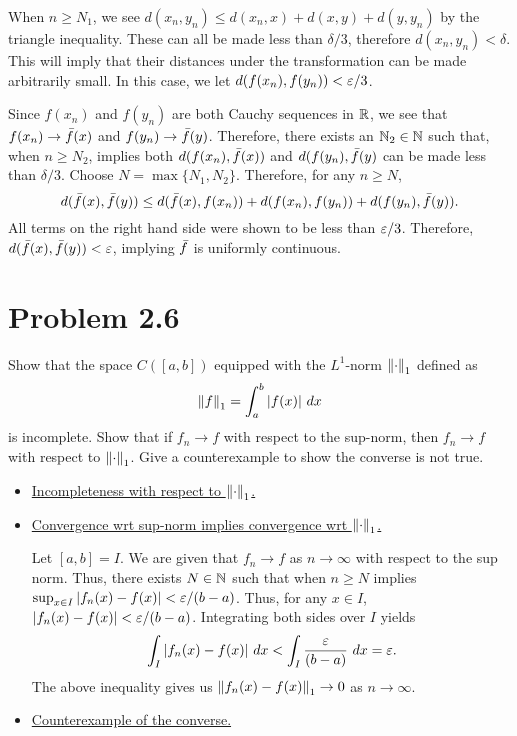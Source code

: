 \begin{solution}
\begin{itemize}[-]
        \jump
        When $n \geq N_1$, we see $d(x_n, y_n) \leq d(x_n, x) + d(x, y) + d(y, y_n)$ by the triangle inequality. These can all be made less than $\delta / 3$, therefore $d(x_n, y_n) < \delta$. This will imply that their distances under the transformation can be made arbitrarily small. In this case, we let $d(f(x_n), f(y_n)) < \varepsilon / 3$. \par

        \jump
        Since $f(x_n)$ and $f(y_n)$ are both Cauchy sequences in $\mathbb{R}$, we see that $f(x_n) \rightarrow \Bar{f}(x)$ and $f(y_n) \rightarrow \Bar{f}(y)$. Therefore, there exists an $\mathbb{N}_2 \in \mathbb{N}$ such that, when $n \geq N_2$, implies both $d(f(x_n), \Bar{f}(x))$ and $d(f(y_n), \Bar{f}(y)$ can be made less than $\delta / 3$. Choose $N = \max \{ N_1, N_2 \}$. Therefore, for any $n \geq N$, 
        \[d(\Bar{f}(x), \Bar{f}(y)) \leq d(\Bar{f}(x), f(x_n)) + d(f(x_n), f(y_n)) + d(f(y_n), \Bar{f}(y)).\]
        All terms on the right hand side were shown to be less than $\varepsilon / 3$. Therefore, $d(\Bar{f}(x), \Bar{f}(y)) < \varepsilon$, implying $\Bar{f}$ is uniformly continuous.
    \end{itemize}
\end{solution}

\newpage
\section{Problem 2.6}
Show that the space $C([a, b])$ equipped with the $L^1$-norm $\norm{\cdot}_1$ defined as 
\[\norm{f}_1 = \int_a^b |f(x)| \ dx\]
is incomplete. Show that if $f_n \rightarrow f$ with respect to the sup-norm, then $f_n \rightarrow f$ with respect to $\norm{\cdot}_1$. Give a counterexample to show the converse is not true.
\partbreak
\begin{solution}

    \begin{itemize}[-]
        \item \underline{Incompleteness with respect to $\norm{\cdot}_1$.}
        \item \underline{Convergence wrt sup-norm implies convergence wrt $\norm{\cdot}_1$.}

        \jump
        Let $[a, b] = I$. We are given that $f_n \rightarrow f$ as $n \rightarrow \infty$ with respect to the sup norm. Thus, there exists $N \in \mathbb{N}$ such that when $n \geq N$ implies $\sup_{x \in I} |f_n(x) - f(x)| < \varepsilon / (b - a)$. Thus, for any $x \in I$, $|f_n(x) - f(x)| < \varepsilon / (b - a)$. Integrating both sides over $I$ yields
        \[\int_I |f_n(x) - f(x)| \ dx < \int_I \frac{\varepsilon}{(b - a)} \ dx = \varepsilon. \]
        The above inequality gives us $\norm{f_n(x) - f(x)}_1 \rightarrow 0$ as $n \rightarrow \infty$. 

        \item \underline{Counterexample of the converse.}
    \end{itemize}
\end{solution}
